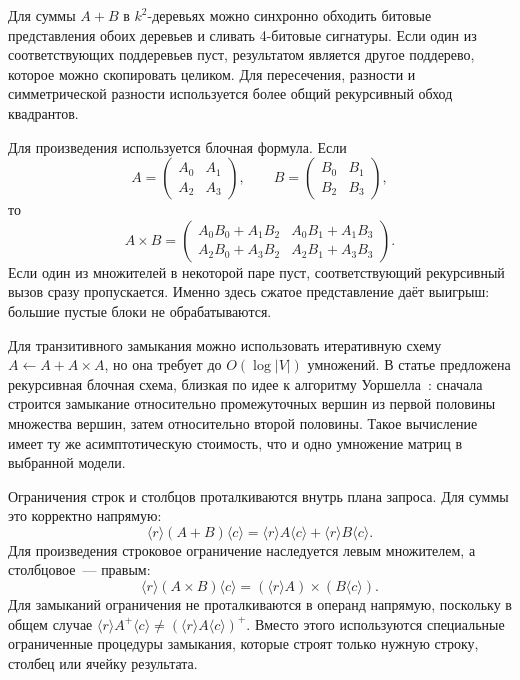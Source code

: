 Для суммы $A+B$ в $k^2$-деревьях можно синхронно обходить битовые представления обоих деревьев и сливать 4-битовые сигнатуры. Если один из соответствующих поддеревьев пуст, результатом является другое поддерево, которое можно скопировать целиком. Для пересечения, разности и симметрической разности используется более общий рекурсивный обход квадрантов.

Для произведения используется блочная формула. Если
\[
    A = \begin{pmatrix} A_0 & A_1 \\ A_2 & A_3 \end{pmatrix}, \qquad
    B = \begin{pmatrix} B_0 & B_1 \\ B_2 & B_3 \end{pmatrix},
\]
то
\[
    A \times B =
    \begin{pmatrix}
        A_0B_0 + A_1B_2 & A_0B_1 + A_1B_3 \\
        A_2B_0 + A_3B_2 & A_2B_1 + A_3B_3
    \end{pmatrix}.
\]
Если один из множителей в некоторой паре пуст, соответствующий рекурсивный вызов сразу пропускается. Именно здесь сжатое представление даёт выигрыш: большие пустые блоки не обрабатываются.

Для транзитивного замыкания можно использовать итеративную схему $A \gets A + A \times A$, но она требует до $O(\log |V|)$ умножений. В статье предложена рекурсивная блочная схема, близкая по идее к алгоритму Уоршелла~: сначала строится замыкание относительно промежуточных вершин из первой половины множества вершин, затем относительно второй половины. Такое вычисление имеет ту же асимптотическую стоимость, что и одно умножение матриц в выбранной модели.

Ограничения строк и столбцов проталкиваются внутрь плана запроса. Для суммы это корректно напрямую:
\[
    \langle r\rangle(A+B)\langle c\rangle = \langle r\rangle A\langle c\rangle + \langle r\rangle B\langle c\rangle.
\]
Для произведения строковое ограничение наследуется левым множителем, а столбцовое~--- правым:
\[
    \langle r\rangle(A\times B)\langle c\rangle = (\langle r\rangle A) \times (B\langle c\rangle).
\]
Для замыканий ограничения не проталкиваются в операнд напрямую, поскольку в общем случае $\langle r\rangle A^+ \langle c\rangle \neq (\langle r\rangle A \langle c\rangle)^+$. Вместо этого используются специальные ограниченные процедуры замыкания, которые строят только нужную строку, столбец или ячейку результата.

